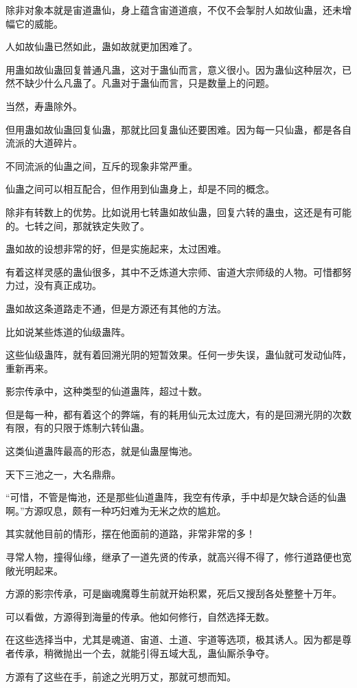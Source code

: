 \begin{this_body}
除非对象本就是宙道蛊仙，身上蕴含宙道道痕，不仅不会掣肘人如故仙蛊，还未增幅它的威能。

人如故仙蛊已然如此，蛊如故就更加困难了。

用蛊如故仙蛊回复普通凡蛊，这对于蛊仙而言，意义很小。因为蛊仙这种层次，已然不缺少什么凡蛊了。凡蛊对于蛊仙而言，只是数量上的问题。

当然，寿蛊除外。

但用蛊如故仙蛊回复仙蛊，那就比回复蛊仙还要困难。因为每一只仙蛊，都是各自流派的大道碎片。

不同流派的仙蛊之间，互斥的现象非常严重。

仙蛊之间可以相互配合，但作用到仙蛊身上，却是不同的概念。

除非有转数上的优势。比如说用七转蛊如故仙蛊，回复六转的蛊虫，这还是有可能的。七转之间，那就铁定失败了。

蛊如故的设想非常的好，但是实施起来，太过困难。

有着这样灵感的蛊仙很多，其中不乏炼道大宗师、宙道大宗师级的人物。可惜都努力过，没有真正成功。

蛊如故这条道路走不通，但是方源还有其他的方法。

比如说某些炼道的仙级蛊阵。

这些仙级蛊阵，就有着回溯光阴的短暂效果。任何一步失误，蛊仙就可发动仙阵，重新再来。

影宗传承中，这种类型的仙道蛊阵，超过十数。

但是每一种，都有着这个的弊端，有的耗用仙元太过庞大，有的是回溯光阴的次数有限，有的只限于炼制六转仙蛊。

这类仙道蛊阵最高的形态，就是仙蛊屋悔池。

天下三池之一，大名鼎鼎。

“可惜，不管是悔池，还是那些仙道蛊阵，我空有传承，手中却是欠缺合适的仙蛊啊。”方源叹息，颇有一种巧妇难为无米之炊的尴尬。

其实就他目前的情形，摆在他面前的道路，非常非常的多！

寻常人物，撞得仙缘，继承了一道先贤的传承，就高兴得不得了，修行道路便也宽敞光明起来。

方源的影宗传承，可是幽魂魔尊生前就开始积累，死后又搜刮各处整整十万年。

可以看做，方源得到海量的传承。他如何修行，自然选择无数。

在这些选择当中，尤其是魂道、宙道、土道、宇道等选项，极其诱人。因为都是尊者传承，稍微抛出一个去，就能引得五域大乱，蛊仙厮杀争夺。

方源有了这些在手，前途之光明万丈，那就可想而知。


\end{this_body}

